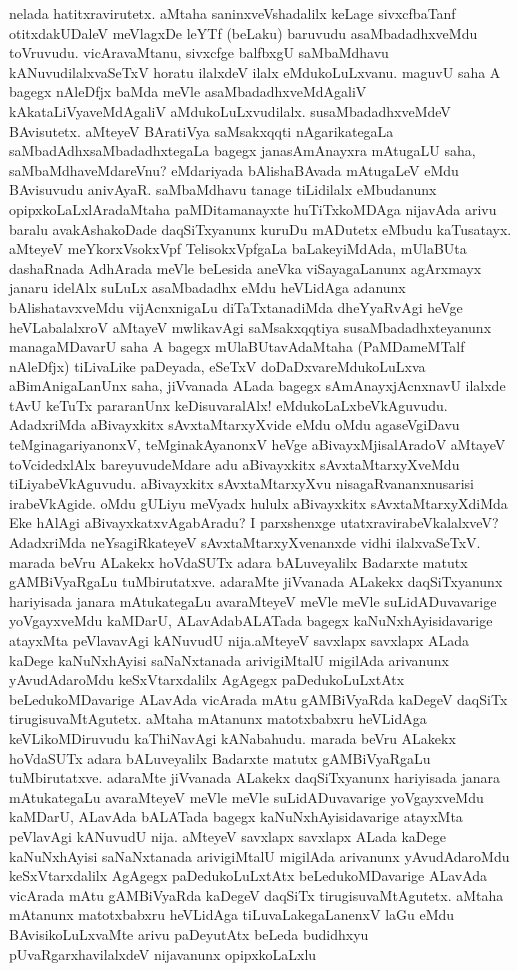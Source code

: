 nelada hatitxravirutetx. aMtaha saninxveVshadalilx keLage sivxcfbaTanf otitxdakUDaleV meVlagxDe leYTf (beLaku) baruvudu asaMbadadhxveMdu toVruvudu. vicAravaMtanu, \hbox{sivxcfge} balfbxgU saMbaMdhavu kANuvu\-dilalx\-vaSeTxV horatu ilalxdeV ilalx eMdukoLuLxvanu. maguvU saha A bagegx nAleDfjx baMda meVle asaM\-badadhx\-veMdAgaliV kAkataLiVya\-veMdAgaliV aMdukoLuLxvudilalx. susaMbadadhxveMdeV BAvisutetx. aMteyeV BAra\-tiVya saMsakxqqti nAgarikategaLa saMbadAdhxsaMbadadhxtegaLa bagegx janasAmAnayxra mAtu\-gaLU saha, saMbaMdha\-veMda\-reVnu? eMdariyada bAlishaBAvada mAtugaLeV eMdu BAvisu\-vudu ani\-vAyaR. saMbaMdhavu\- tanage tiLi\-dilalx eMbudanunx opipxkoLaLx\-lAra\-daMtaha paMDitamanayxte huTiTx\-koMDAga nija\-vAda arivu bara\-lu ava\-kAsha\-koDade daqSiTxyanunx kuruDu mADutetx  eMbudu kaTusatayx. aMteyeV meYkorxV\-sokxVpf Teli\-sokxVpf\-gaLa baLakeyiMdAda, mUlaBUta dashaRnada AdhArada meVle beLesida aneVka viSaya\-gaLanunx \-agArxmayx janaru idelAlx suLuLx asaMbadadhx eMdu heVLi\-dAga adanunx bAlishatavxveMdu vijAcnxnigaLu diTaTx\-tana\-diMda dheYyaRvAgi heVge heVLa\-balalxroV aMtayeV mwlikavAgi saMsakxqqtiya susaMbadadhxteyanunx mana\-gaMDa\-varU saha A bagegx mUlaBUtavAdaMtaha (PaMDameMTalf nAleDfjx) tiLivaLike paDeyada, eSeTxV doDaDxva\-reMdu\-koLuLxva aBimAnigaLanUnx saha, jiVvanada ALada bagegx sAmAnayxjAcnxnavU ilalxde tAvU \-keTuTx pararanUnx keDisuvaralAlx! eMdukoLaLxbeVkAguvudu. AdadxriMda aBivayxkitx sAvxtaMtarxyXvide eMdu oMdu agaseVgiDavu teMginagariyanonxV, teMginakAyanonxV heVge aBi\-vayxMjisa\-lAradoV \-aMtayeV toVci\-dedxlAlx bareyuvudeMdare adu aBivayxkitx sAvxtaMtarxyXveMdu tiLiyabeVkAguvudu. aBi\-vayxkitx sAvxtaM\-tarxyXvu nisagaRvananxnusarisi irabeVkAgide. oMdu gULiyu meVyadx hululx aBi\-vayxkitx sAvxtaMtarxyX\-diMda Eke hAlAgi aBivayxkatxvAgabAradu? I parxshenxge utatxravirabeVka\-lalxveV? AdadxriMda neYsagiR\-kateyeV sAvxtaM\-tarxyXvenanxde vidhi ilalxvaSeTxV. marada beVru ALakekx hoVdaSUTx adara bALuveyalilx Badarxte matutx gAMBiVyaR\-gaLu tuMbiru\-tatxve. adaraMte jiVvanada ALakekx daqSiTxyanunx hariyisada janara mAtukategaLu ava\-raMteyeV meVle meVle suLidADuvavarige yoVgayxveMdu kaMDarU, ALavAda\break bALATada bagegx kaNuNx\-hAyisidavarige atayxMta peVlavavAgi kANuvudU nija.\break aMteyeV savxlapx savxlapx ALada kaDege kaNuNxhAyisi saNaNxtanada arivi\-giMtalU migi\-lAda arivanunx yAvudAdaroMdu keSxVtarxdalilx AgAgegx paDedukoLuLxtAtx beLedu\-koMDava\-rige ALavAda vicArada mAtu gAMBiV\-yaRda kaDegeV daqSiTx tiru\-gisu\-vaMtA\-gutetx. aMtaha mAtanunx matotx\-babxru heVLidAga keVLikoMDiruvudu kaThiNa\-vAgi kANa\-bahudu. marada beVru ALakekx hoVdaSUTx adara bALuveyalilx Badarxte matutx gAMBiVyaRgaLu tuMbirutatxve. adaraMte jiVvanada ALakekx daqSiTx\-yanunx hariyisada janara mAtukategaLu avaraMteyeV meVle meVle suLidADuvavarige yoVgayx\-veMdu kaMDarU,\- ALavAda bALATada bagegx kaNuNxhAyisidavarige atayxMta peVlavAgi kANuvudU nija. aMteyeV savxlapx savxlapx ALada kaDege kaNuNxhAyisi saNaNxtanada arivigiMtalU migilAda arivanunx yAvudAdaroMdu keSxVtarx\-dalilx AgAgegx paDedukoLuLxtAtx beLedukoMDavarige ALavAda vicArada mAtu gAMBiVyaRda kaDegeV daqSiTx tirugisu\-vaMtAgutetx. aMtaha mAtanunx matotxbabxru heVLidAga tiLuvaLakegaLanenxV laGu eMdu BAvisi\-koLuLxvaMte arivu paDe\-yutAtx beLeda budidhxyu pUvaRgarxhavilalxdeV nijavanunx opipxkoLaLxlu 